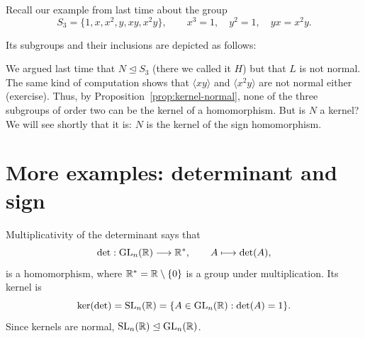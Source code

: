 \documentclass[reqno,11pt]{amsart}
\begin{document}
\begin{example}
Recall our example from last time about the group
\[
  S_3=\{1,x,x^2,y,xy,x^2y\},\qquad
  x^3=1,\quad y^2=1,\quad yx=x^2y.
\]

Its subgroups and their inclusions are depicted as follows:


\begin{center}
\end{center}

We argued last time that $N\trianglelefteq S_3$ (there we called it $H$)
but that $L$ is not normal. The same kind of computation shows that
$\langle xy\rangle$ and $\langle x^2y\rangle$ are not normal either
(exercise). Thus, by Proposition~\ref{prop:kernel-normal}, none of the three
subgroups of order two can be the kernel of a homomorphism. But is $N$ a
kernel? We will see shortly that it is: $N$ is the kernel of the sign
homomorphism.
\end{example}


\section{More examples: determinant and sign}

\begin{example}
Multiplicativity of the determinant says that
\begin{equation}
  \det:\operatorname{GL}_n(\mathbb{R})\longrightarrow\mathbb{R}^*,
  \qquad A\longmapsto\det(A),
\end{equation}
is a homomorphism, where $\mathbb{R}^*=\mathbb{R}\setminus\{0\}$ is a group under
multiplication. Its kernel is
\[
  \ker(\det)=\operatorname{SL}_n(\mathbb{R})
  =\{A\in\operatorname{GL}_n(\mathbb{R}):\det(A)=1\}.
\]
Since kernels are normal, $\operatorname{SL}_n(\mathbb{R})\trianglelefteq\operatorname{GL}_n(\mathbb{R})$.
\end{example}
\end{document}
